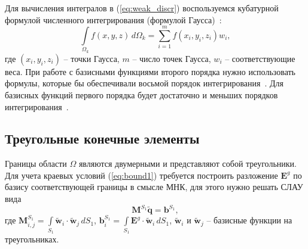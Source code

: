 \documentclass[a4paper,14pt]{article}
\begin{document}
Для вычисления интегралов в (\ref{eq:weak_discr}) воспользуемся кубатурной формулой численного интегрирования (формулой Гаусса)~\citep{misovskih}:
\begin{equation*}
	\int\limits_{\Omega_k} f(x, y, z) \,d\Omega_k = \sum\limits_{i = 1}^m f( x_i , y_i , z_i ) w_i ,
\end{equation*}
где $(x_i , y_i , z_i )$ -- точки Гаусса, $m$ -- число точек Гаусса, $w_i$ -- соответствующие веса. При работе с базисными функциями второго порядка нужно использовать формулы, которые бы обеспечивали восьмой порядок интегрирования~\citep{zhang_integration}. Для базисных функций первого порядка будет достаточно и меньших порядков интегрирования~\citep{tet_integration, misovskih}.


\subsection{Треугольные конечные элементы}

Границы области $\Omega$ являются двумерными и представляют собой треугольники. Для учета краевых условий (\ref{eq:bound1}) требуется построить разложение $\mathbf{E}^g$ по базису соответствующей границы в смысле МНК, для этого нужно решать СЛАУ вида
\begin{equation}
	\mathbf{M}^{S_1} \tilde{\mathbf{q}} = \mathbf{b}^{S_1} ,
	\label{eq:bound_mnk}
\end{equation}
где $\displaystyle \mathbf{M}^{S_1}_{i,j} = \int\limits_{S_1} \tilde{\mathbf{w}}_i \cdot \tilde{\mathbf{w}}_j \,d S_1$, $\displaystyle \mathbf{b}^{S_1}_{i} = \int\limits_{S_1} \mathbf{E}^g \cdot \tilde{\mathbf{w}}_i \,d S_1$, $\tilde{\mathbf{w}}_i$ и $\tilde{\mathbf{w}}_j$ -- базисные функции на треугольниках.
\end{document}
